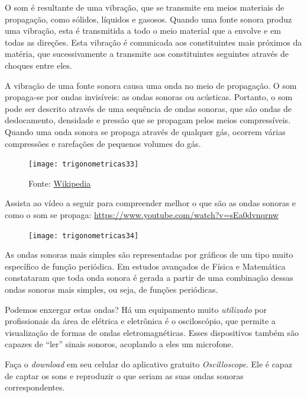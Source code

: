 \begin{knowledge}
O som é resultante de uma vibração, que se transmite em meios materiais de propagação, como sólidos, líquidos e gasosos.  Quando uma fonte sonora produz uma vibração, esta é transmitida a todo o meio material que a envolve e em todas as direções. Esta vibração é comunicada aos constituintes mais próximos da matéria, que sucessivamente a transmite aos constituintes seguintes através de choques entre eles.

A vibração de uma fonte sonora causa uma onda no meio de propagação. O som propaga-se por ondas invisíveis: as ondas sonoras ou acústicas. Portanto, o som pode ser descrito através de uma sequência de ondas sonoras, que são ondas de deslocamento, densidade e pressão que se propagam pelos meios compressíveis. Quando uma onda sonora se propaga através de qualquer gás, ocorrem várias compressões e rarefações de pequenos volumes do gás.

\begin{figure}[H]
\centering

\texttt{[image: trigonometricas33]}
\caption{Fonte: \href{https://pt.wikipedia.org/wiki/Som}{Wikipedia} }
\label{}
\end{figure}

Assista ao vídeo a seguir para compreender melhor o que são as ondas sonoras e como o som se propaga: \url{https://www.youtube.com/watch?v=sEa0dvnqrnw}

\begin{figure}[H]
\centering

\texttt{[image: trigonometricas34]}
\end{figure}

\needspace{5em}
As ondas sonoras mais simples são representadas por gráficos de um tipo muito específico de função periódica. Em estudos avançados de Física e Matemática constataram que toda onda sonora é gerada a partir de uma combinação dessas ondas sonoras mais simples, ou seja, de funções periódicas.

Podemos enxergar estas ondas? Há um equipamento muito \textit{utilizado} por profissionais da área de elétrica e eletrônica é o osciloscópio, que permite a visualização de formas de ondas eletromagnéticas. Esses dispositivos também são capazes de “ler”{} sinais sonoros, acoplando a eles um microfone.

Faça o \textit{download} em seu celular do aplicativo gratuito \textit{Oscilloscope}. Ele é capaz de captar os sons e reproduzir o que seriam as suas ondas sonoras correspondentes.


\end{knowledge}
